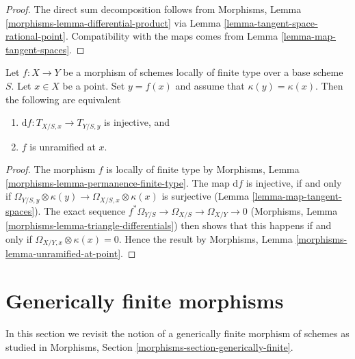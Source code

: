 \begin{proof}
The direct sum decomposition follows from
Morphisms, Lemma \ref{morphisms-lemma-differential-product}
via Lemma \ref{lemma-tangent-space-rational-point}. Compatibility
with the maps comes from Lemma \ref{lemma-map-tangent-spaces}.
\end{proof}

\begin{lemma}
\label{lemma-injective-tangent-spaces-unramified}
Let $f : X \to Y$ be a morphism of schemes locally of finite type over a
base scheme $S$. Let $x \in X$ be a point. Set $y = f(x)$ and assume
that $\kappa(y) = \kappa(x)$. Then the following are equivalent
\begin{enumerate}
\item $\text{d}f : T_{X/S, x} \longrightarrow T_{Y/S, y}$ is injective, and
\item $f$ is unramified at $x$.
\end{enumerate}
\end{lemma}

\begin{proof}
The morphism $f$ is locally of finite type by
Morphisms, Lemma \ref{morphisms-lemma-permanence-finite-type}.
The map $\text{d}f$ is injective, if and only if
$\Omega_{Y/S, y} \otimes \kappa(y) \to \Omega_{X/S, x} \otimes \kappa(x)$
is surjective (Lemma \ref{lemma-map-tangent-spaces}).
The exact sequence $f^*\Omega_{Y/S} \to \Omega_{X/S} \to \Omega_{X/Y} \to 0$
(Morphisms, Lemma \ref{morphisms-lemma-triangle-differentials})
then shows that this happens if and only if
$\Omega_{X/Y, x} \otimes \kappa(x) = 0$.
Hence the result by
Morphisms, Lemma \ref{morphisms-lemma-unramified-at-point}.
\end{proof}






\section{Generically finite morphisms}
\label{section-generically-finite}

\noindent
In this section we revisit the notion of a generically finite
morphism of schemes as studied in
Morphisms, Section \ref{morphisms-section-generically-finite}.

